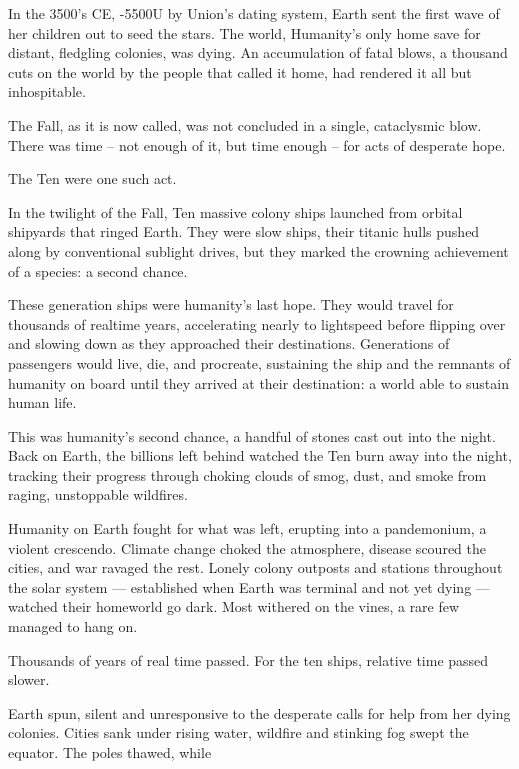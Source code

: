 In the 3500’s CE, -5500U by Union’s dating system, Earth sent the first wave of her children out  
to seed the stars. The world, Humanity’s only home save for distant, fledgling colonies, was  
dying. An accumulation of fatal blows, a thousand cuts on the world by the people that called it  
home, had rendered it all but inhospitable. 
 

The Fall, as it is now called, was not concluded in a single, cataclysmic blow. There was time --  
not enough of it, but time enough -- for acts of desperate hope. 
 

The Ten were one such act. 
 

In the twilight of the Fall, Ten massive colony ships launched from orbital shipyards that ringed  
Earth. They were slow ships, their titanic hulls pushed along by conventional sublight drives, but  
they marked the crowning achievement of a species: a second chance.
 

These generation ships were humanity’s last hope. They would travel for thousands of realtime  
years, accelerating nearly to lightspeed before flipping over and slowing down as they  
approached their destinations. Generations of passengers would live, die, and procreate,  
sustaining the ship and the remnants of humanity on board until they arrived at their destination:  
a world able to sustain human life.
 

This was humanity’s second chance, a handful of stones cast out into the night. Back on Earth,  
the billions left behind watched the Ten burn away into the night, tracking their progress through  
choking clouds of smog, dust, and smoke from raging, unstoppable wildfires. 
 

Humanity on Earth fought for what was left, erupting into a pandemonium, a violent crescendo.  
Climate change choked the atmosphere, disease scoured the cities, and war ravaged the rest.  
Lonely colony outposts and stations throughout the solar system — established when Earth was  
terminal and not yet dying — watched their homeworld go dark. Most withered on the vines, a  
rare few managed to hang on. 
 

Thousands of years of real time passed. For the ten ships, relative time passed slower. 
 

Earth spun, silent and unresponsive to the desperate calls for help from her dying colonies. Cities  
sank under rising water, wildfire and stinking fog swept the equator. The poles thawed, while  

                                                                                                                  


